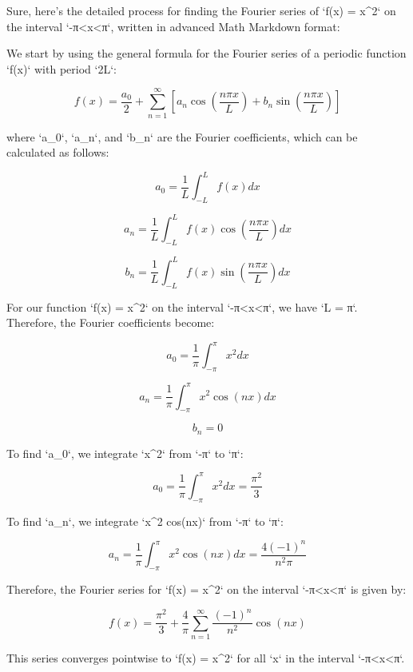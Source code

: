 Sure, here's the detailed process for finding the Fourier series of `f(x) = x^2` on the interval `-π<x<π`, written in advanced Math Markdown format:

We start by using the general formula for the Fourier series of a periodic function `f(x)` with period `2L`:

$$
f(x) = \frac{a_0}{2} + \sum_{n=1}^{\infty} [a_n \cos(\frac{n\pi x}{L}) + b_n \sin(\frac{n\pi x}{L})]
$$

where `a_0`, `a_n`, and `b_n` are the Fourier coefficients, which can be calculated as follows:

$$
a_0 = \frac{1}{L} \int_{-L}^{L} f(x) dx
$$

$$
a_n = \frac{1}{L} \int_{-L}^{L} f(x) \cos(\frac{n\pi x}{L}) dx
$$

$$
b_n = \frac{1}{L} \int_{-L}^{L} f(x) \sin(\frac{n\pi x}{L}) dx
$$

For our function `f(x) = x^2` on the interval `-π<x<π`, we have `L = π`. Therefore, the Fourier coefficients become:

$$
a_0 = \frac{1}{\pi} \int_{-\pi}^{\pi} x^2 dx
$$

$$
a_n = \frac{1}{\pi} \int_{-\pi}^{\pi} x^2 \cos(nx) dx
$$

$$
b_n = 0
$$

To find `a_0`, we integrate `x^2` from `-π` to `π`:

$$
a_0 = \frac{1}{\pi} \int_{-\pi}^{\pi} x^2 dx = \frac{\pi^2}{3}
$$

To find `a_n`, we integrate `x^2 cos(nx)` from `-π` to `π`:

$$
a_n = \frac{1}{\pi} \int_{-\pi}^{\pi} x^2 \cos(nx) dx = \frac{4(-1)^n}{n^2\pi}
$$

Therefore, the Fourier series for `f(x) = x^2` on the interval `-π<x<π` is given by:

$$
f(x) = \frac{\pi^2}{3} + \frac{4}{\pi} \sum_{n=1}^{\infty} \frac{(-1)^n}{n^2} \cos(nx)
$$

This series converges pointwise to `f(x) = x^2` for all `x` in the interval `-π<x<π`.
